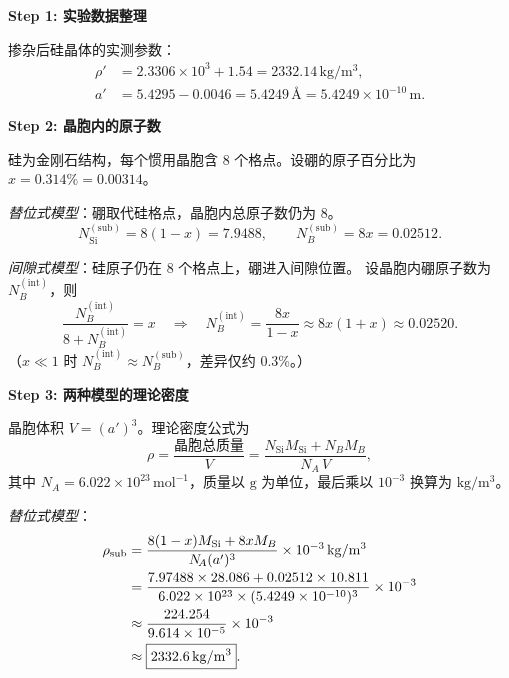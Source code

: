 \begin{derivationbox}[标准解题过程]
\textbf{Step 1: 实验数据整理}

掺杂后硅晶体的实测参数：
\begin{align}
\rho' &= 2.3306\times 10^{3} + 1.54 = 2332.14\,\mathrm{kg/m^{3}},\\
a' &= 5.4295 - 0.0046 = 5.4249\,\text{\AA} = 5.4249\times 10^{-10}\,\mathrm{m}.
\end{align}

\textbf{Step 2: 晶胞内的原子数}

硅为金刚石结构，每个惯用晶胞含 $8$ 个格点。设硼的原子百分比为 $x=0.314\%=0.00314$。

\textit{替位式模型}：硼取代硅格点，晶胞内总原子数仍为 $8$。
\begin{equation}
N_{\mathrm{Si}}^{(\mathrm{sub})} = 8(1-x) = 7.9488,\qquad
N_B^{(\mathrm{sub})} = 8x = 0.02512.
\end{equation}

\textit{间隙式模型}：硅原子仍在 $8$ 个格点上，硼进入间隙位置。
设晶胞内硼原子数为 $N_B^{(\mathrm{int})}$，则
\begin{equation}
\frac{N_B^{(\mathrm{int})}}{8+N_B^{(\mathrm{int})}} = x
\quad\Longrightarrow\quad
N_B^{(\mathrm{int})} = \frac{8x}{1-x} \approx 8x(1+x) \approx 0.02520.
\end{equation}
（$x\ll 1$ 时 $N_B^{(\mathrm{int})}\approx N_B^{(\mathrm{sub})}$，差异仅约 $0.3\%$。）

\textbf{Step 3: 两种模型的理论密度}

晶胞体积 $V = (a')^{3}$。理论密度公式为
\begin{equation}
\rho = \frac{\text{晶胞总质量}}{V}
= \frac{N_{\mathrm{Si}}M_{\mathrm{Si}} + N_B M_B}{N_{\!A}\,V},
\end{equation}
其中 $N_{\!A}=6.022\times 10^{23}\,\mathrm{mol^{-1}}$，质量以 $\mathrm{g}$ 为单位，最后乘以 $10^{-3}$ 换算为 $\mathrm{kg/m^{3}}$。

\textit{替位式模型}：
\begin{align}
\rho_{\mathrm{sub}}
&= \frac{8(1-x)M_{\mathrm{Si}} + 8x M_B}{N_{\!A}(a')^{3}}\times 10^{-3}\,\mathrm{kg/m^{3}} \notag\\
&= \frac{7.97488\times 28.086 + 0.02512\times 10.811}{6.022\times 10^{23}\times(5.4249\times 10^{-10})^{3}}\times 10^{-3} \notag\\
&\approx \frac{224.254}{9.614\times 10^{-5}}\times 10^{-3} \notag\\
&\approx \boxed{2332.6\,\mathrm{kg/m^{3}}}.
\label{eq:sub-density}
\end{align}


\end{derivationbox}
